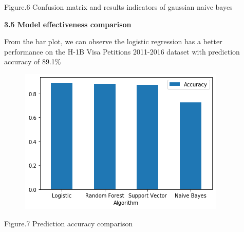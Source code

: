 \documentclass[12pt]{article}
\begin{document}

\par

\begin{Center}
{\fontsize{8pt}{9.6pt}\selectfont Figure.6 Confusion matrix and results indicators of gaussian naive bayes\par}
\end{Center}\par


\vspace{\baselineskip}
\textbf{3.5 Model effectiveness comparison}\par

\begin{justify}
From the bar plot, we can observe the logistic regression has a better performance on the H-1B Visa Petitions 2011-2016 dataset with prediction accuracy of 89.1$\%$ 
\end{justify}\par




\begin{figure}[H]
	\begin{Center}
		\includegraphics[width=3.88in,height=2.73in]{./media/image5.png}
	\end{Center}
\end{figure}



\par

\begin{Center}
{\fontsize{8pt}{9.6pt}\selectfont Figure.7 Prediction accuracy comparison \par}
\end{Center}\par
\end{document}
